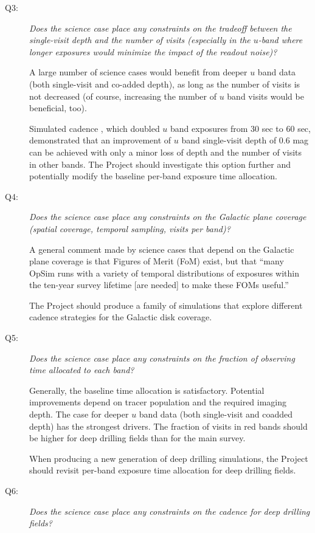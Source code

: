 \begin{description}
\item[Q3:] {\it Does the science case place any constraints on the
tradeoff between the single-visit depth and the number of visits
(especially in the $u$-band where longer exposures would minimize the
impact of the readout noise)?}


A large number of science cases would benefit from deeper $u$ band data
(both single-visit and co-added depth), as long as the number of visits
is not decreased (of course, increasing the number of $u$ band visits
would be beneficial, too).

Simulated cadence , which
doubled $u$ band exposures from 30 sec to 60 sec, demonstrated that an
improvement of $u$ band single-visit depth of 0.6 mag can be achieved
with only a minor loss of depth and the number of visits in other bands.
The Project should investigate this option further and potentially
modify the baseline per-band exposure time allocation.


\item[Q4:] {\it Does the science case place any constraints on the
Galactic plane coverage (spatial coverage, temporal sampling, visits per
band)?}

A general comment made by science cases that depend on the Galactic
plane coverage is that Figures of Merit (FoM) exist, but that ``many
OpSim runs with a variety of temporal distributions of exposures within
the ten-year survey lifetime [are needed] to make these FOMs useful.''

The Project should produce a family of simulations that explore
different cadence strategies for the Galactic disk coverage.


\item[Q5:] {\it Does the science case place any constraints on the
fraction of observing time allocated to each band?}

Generally, the baseline time allocation is satisfactory. Potential
improvements depend on tracer population and the required imaging depth.
The case for deeper $u$ band data (both single-visit and coadded depth)
has the strongest drivers. The fraction of visits in red bands should be
higher for deep drilling fields than for the main survey.

When producing a new generation of deep drilling simulations, the
Project should revisit per-band exposure time allocation for deep
drilling fields.


\item[Q6:] {\it Does the science case place any constraints on the
cadence for deep drilling fields?}


\end{description}
